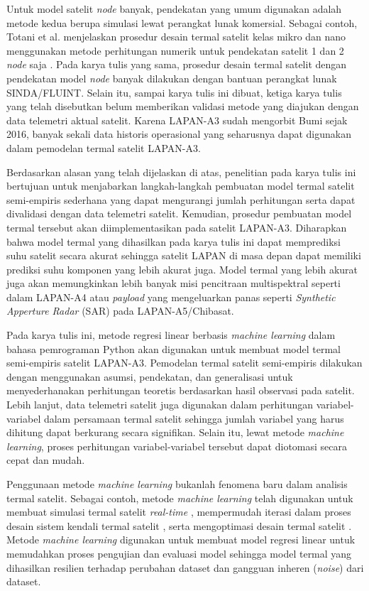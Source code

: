 Untuk model satelit \textit{node} banyak, pendekatan yang umum digunakan adalah
metode kedua berupa simulasi lewat perangkat lunak komersial. Sebagai contoh,
Totani et al. menjelaskan prosedur desain termal satelit kelas mikro dan nano
menggunakan metode perhitungan numerik untuk pendekatan satelit 1 dan 2
\textit{node} saja \cite{totani2014}. Pada karya tulis yang sama, prosedur
desain termal satelit dengan pendekatan model \textit{node} banyak dilakukan
dengan bantuan perangkat lunak SINDA/FLUINT. Selain itu, sampai karya tulis ini
dibuat, ketiga karya tulis yang telah disebutkan belum memberikan validasi
metode yang diajukan dengan data telemetri aktual satelit. Karena LAPAN-A3
sudah mengorbit Bumi sejak 2016, banyak sekali data historis operasional yang
seharusnya dapat digunakan dalam pemodelan termal satelit LAPAN-A3.

Berdasarkan alasan yang telah dijelaskan di atas, penelitian pada karya tulis
ini bertujuan untuk menjabarkan langkah-langkah pembuatan model termal satelit
semi-empiris sederhana yang dapat mengurangi jumlah perhitungan serta dapat
divalidasi dengan data telemetri satelit. Kemudian, prosedur pembuatan model
termal tersebut akan diimplementasikan pada satelit LAPAN-A3. Diharapkan bahwa
model termal yang dihasilkan pada karya tulis ini dapat memprediksi suhu
satelit secara akurat sehingga satelit LAPAN di masa depan dapat memiliki
prediksi suhu komponen yang lebih akurat juga. Model termal yang lebih akurat
juga akan memungkinkan lebih banyak misi pencitraan multispektral seperti dalam
LAPAN-A4 atau \textit{payload} yang mengeluarkan panas seperti
\textit{Synthetic Apperture Radar} (SAR) pada LAPAN-A5/Chibasat.

Pada karya tulis ini, metode regresi linear berbasis \textit{machine learning}
dalam bahasa pemrograman Python akan digunakan untuk membuat model termal
semi-empiris satelit LAPAN-A3. Pemodelan termal satelit semi-empiris dilakukan
dengan menggunakan asumsi, pendekatan, dan generalisasi untuk menyederhanakan
perhitungan teoretis berdasarkan hasil observasi pada satelit. Lebih lanjut,
data telemetri satelit juga digunakan dalam perhitungan variabel-variabel dalam
persamaan termal satelit sehingga jumlah variabel yang harus dihitung dapat
berkurang secara signifikan. Selain itu, lewat metode \textit{machine
learning}, proses perhitungan variabel-variabel tersebut dapat diotomasi secara
cepat dan mudah.

Penggunaan metode \textit{machine learning} bukanlah fenomena baru dalam
analisis termal satelit. Sebagai contoh, metode \textit{machine learning} telah
digunakan untuk membuat simulasi termal satelit \textit{real-time}
\cite{junior2017}, mempermudah iterasi dalam proses desain sistem kendali
termal satelit \cite{escobar2016}, serta mengoptimasi desain termal satelit
\cite{xiong2020}. Metode \textit{machine learning} digunakan untuk membuat
model regresi linear untuk memudahkan proses pengujian dan evaluasi model sehingga model
termal yang dihasilkan resilien terhadap perubahan dataset dan gangguan inheren
(\textit{noise}) dari dataset.

